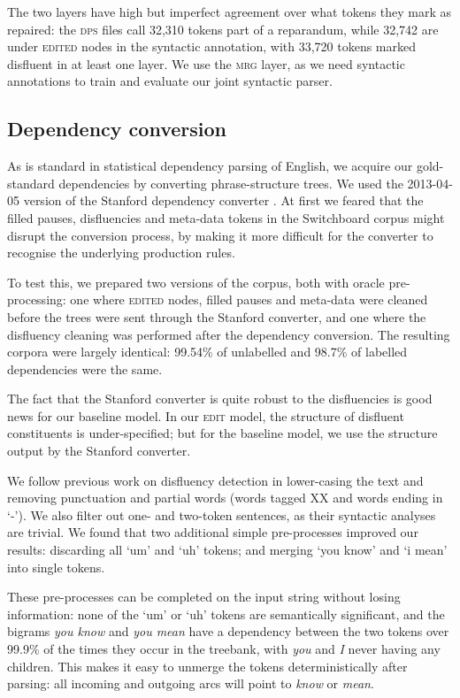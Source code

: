 \documentclass[11pt,letterpaper]{article}
\begin{document}
The two layers have high but imperfect agreement over
what tokens they mark as repaired: the \textsc{dps} files call
32,310 tokens part of a reparandum, while 32,742 are under \textsc{edited} nodes in
the syntactic annotation, with 33,720 tokens marked disfluent in at least one layer.
We use the \textsc{mrg} layer, as we need syntactic annotations to train and
evaluate our joint syntactic parser.

\subsection{Dependency conversion}

\label{sec:deps}
As is standard in statistical dependency parsing of English, we acquire our
gold-standard dependencies by converting phrase-structure trees.
We used the 2013-04-05 version of the Stanford dependency converter \citep{stanford_deps}.
At first we feared that the filled pauses, disfluencies and meta-data tokens in
the Switchboard corpus might disrupt the conversion process, by making it more
difficult for the converter to recognise the underlying production rules.

To test this, we prepared two versions of the corpus, both with oracle pre-processing:
one where \textsc{edited} nodes, filled pauses and meta-data were cleaned before
the trees were sent through the Stanford converter, and one where the disfluency
cleaning was performed after the dependency conversion. The resulting corpora
were largely identical: 99.54\% of unlabelled and 98.7\% of labelled dependencies
were the same.

The fact that the Stanford converter is quite robust to the disfluencies is good news
for our baseline model. In our \textsc{edit} model, the structure of disfluent
constituents is under-specified; but for the baseline model, we use the structure
output by the Stanford converter.

We follow previous work on disfluency detection in lower-casing the text and
removing punctuation and partial words (words tagged XX and words ending in
`-').  We also filter out one- and two-token sentences, as their syntactic
analyses are trivial.
We found that two additional simple pre-processes improved our results: discarding
all `um' and `uh' tokens; and merging `you know' and `i mean' into single tokens.

These pre-processes can be completed on the input string without losing information:
none of the `um' or `uh' tokens are semantically significant, and
the bigrams \emph{you know} and \emph{you mean} have a dependency between the two
tokens over 99.9\% of the times they occur in the treebank, with \emph{you} and \emph{I}
never having any children. This makes it easy to unmerge the tokens deterministically
after parsing:
all incoming and outgoing arcs will point to \emph{know} or \emph{mean}.
\end{document}
